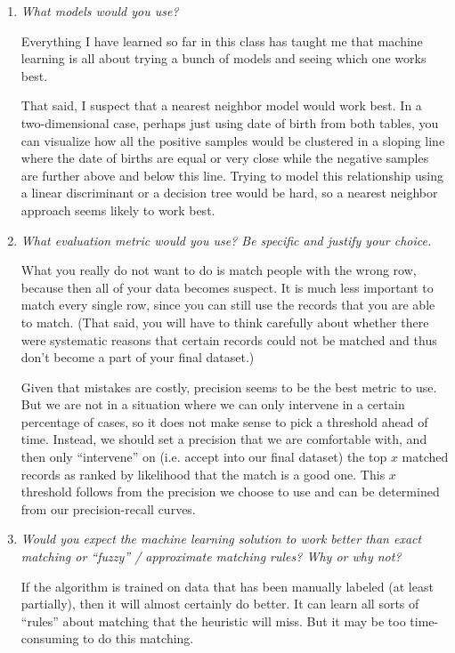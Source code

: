 \documentclass[11pt]{article}
\begin{document}
\begin{enumerate}
    \item \textit{What models would you use?}

        Everything I have learned so far in this class has taught me that
        machine learning is all about trying a bunch of models and seeing which
        one works best.

        That said, I suspect that a nearest neighbor model would work best. In
        a two-dimensional case, perhaps just using date of birth from both
        tables, you can visualize how all the positive samples would be
        clustered in a sloping line where the date of births are equal or very
        close while the negative samples are further above and below this line.
        Trying to model this relationship using a linear discriminant or a
        decision tree would be hard, so a nearest neighbor approach seems
        likely to work best.

    \item \textit{What evaluation metric would you use? Be specific and
        justify your choice.}

        What you really do not want to do is match people with the wrong row,
        because then all of your data becomes suspect. It is much less
        important to match every single row, since you can still use the
        records that you are able to match. (That said, you will have to think
        carefully about whether there were systematic reasons that certain
        records could not be matched and thus don't become a part of your final
        dataset.)

        Given that mistakes are costly, precision seems to be the best metric
        to use. But we are not in a situation where we can only intervene in a
        certain percentage of cases, so it does not make sense to pick a
        threshold ahead of time. Instead, we should set a precision that we are
        comfortable with, and then only ``intervene'' on (i.e. accept into our
        final dataset) the top $x$ matched records as ranked by likelihood that
        the match is a good one. This $x$ threshold follows from the precision
        we choose to use and can be determined from our precision-recall
        curves.

    \item \textit{Would you expect the machine learning solution to work better
        than exact matching or ``fuzzy'' / approximate matching rules? Why or
        why not?}

        If the algorithm is trained on data that has been manually labeled (at
        least partially), then it will almost certainly do better. It can learn
        all sorts of ``rules'' about matching that the heuristic will miss. But
        it may be too time-consuming to do this matching.


\end{enumerate}
\end{document}
